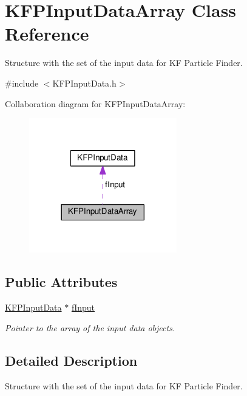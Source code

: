 \hypertarget{structKFPInputDataArray}{}\section{K\+F\+P\+Input\+Data\+Array Class Reference}
\label{structKFPInputDataArray}


Structure with the set of the input data for KF Particle Finder.  




{\ttfamily \#include $<$K\+F\+P\+Input\+Data.\+h$>$}



Collaboration diagram for K\+F\+P\+Input\+Data\+Array\+:\nopagebreak
\begin{figure}[H]
\begin{center}
\leavevmode
\includegraphics[width=182pt]{structKFPInputDataArray__coll__graph}
\end{center}
\end{figure}
\subsection*{Public Attributes}
\begin{DoxyCompactItemize}
\item 
\hyperlink{classKFPInputData}{K\+F\+P\+Input\+Data} $\ast$ \hyperlink{structKFPInputDataArray_ae22c5ff3cb181d5b676838cef57ae4c1}{f\+Input}\hypertarget{structKFPInputDataArray_ae22c5ff3cb181d5b676838cef57ae4c1}{}\label{structKFPInputDataArray_ae22c5ff3cb181d5b676838cef57ae4c1}

\begin{DoxyCompactList}\small\item\em Pointer to the array of the input data objects. \end{DoxyCompactList}\end{DoxyCompactItemize}


\subsection{Detailed Description}
Structure with the set of the input data for KF Particle Finder. 

